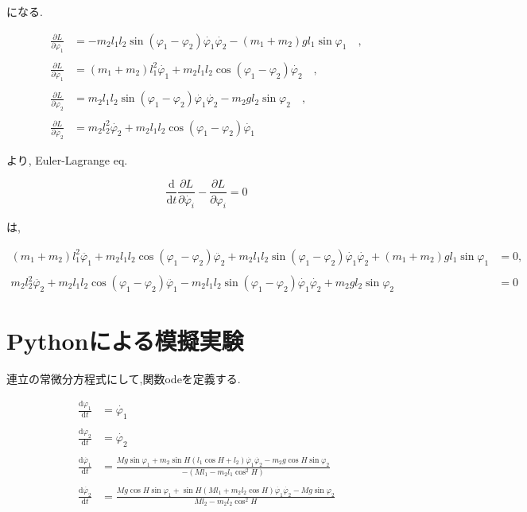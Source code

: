 になる. 

\begin{align*}
\displaystyle\frac{\partial L}{\partial\varphi_1}&=-m_2l_1l_2\sin(\varphi_1-\varphi_2)\dot{\varphi_1}\dot{\varphi_2}-(m_1+m_2)gl_1\sin\varphi_1\quad,\\\\
\displaystyle\frac{\partial L}{\partial\dot{\varphi_1}}&=(m_1+m_2)l_1^2\dot{\varphi_1}+m_2l_1l_2\cos(\varphi_1-\varphi_2)\dot{\varphi_2}\quad,\\\\
\displaystyle\frac{\partial L}{\partial\varphi_2}&=m_2l_1l_2\sin(\varphi_1-\varphi_2)\dot{\varphi_1}\dot{\varphi_2}-m_2gl_2\sin\varphi_2\quad,\\\\
\displaystyle\frac{\partial L}{\partial\dot{\varphi_2}}&=m_2l_2^2\dot{\varphi_2}+m_2l_1l_2\cos(\varphi_1-\varphi_2)\dot{\varphi_1}
\end{align*}

より, Euler-Lagrange eq.

\[
\displaystyle \frac{\mathrm{d}}{\mathrm{d}t}\frac{\partial L}{\partial \dot{\varphi_i}}-\frac{\partial L}{\partial \varphi_i}=0
\]

は,

\begin{align*}
(m_1+m_2)l_1^2\ddot{\varphi_1}+m_2l_1l_2\cos(\varphi_1-\varphi_2)\ddot{\varphi_2}+m_2l_1l_2\sin(\varphi_1-\varphi_2)\dot{\varphi_1}\dot{\varphi_2}+(m_1+m_2)gl_1\sin\varphi_1&=0,\\\\
m_2l_2^2\ddot{\varphi_2}+m_2l_1l_2\cos(\varphi_1-\varphi_2)\ddot{\varphi_1}-m_2l_1l_2\sin(\varphi_1-\varphi_2)\dot{\varphi_1}\dot{\varphi_2}+m_2gl_2\sin\varphi_2&=0
\end{align*}

\section{Pythonによる模擬実験}

連立の常微分方程式にして,関数odeを定義する.

\begin{align*}
\displaystyle\frac{\mathrm{d}\varphi_1}{\mathrm{d}t}&=\dot{\varphi_1}\\\\
\displaystyle\frac{\mathrm{d}\varphi_2}{\mathrm{d}t}&=\dot{\varphi_2}\\\\
\displaystyle\frac{\mathrm{d}\dot{\varphi_1}}{\mathrm{d}t}&=\frac{Mg\sin\varphi_1+m_2\sin H(l_1\cos H+l_2)\dot{\varphi_1}\dot{\varphi_2}-m_2g\cos H\sin\varphi_2}{-\left(Ml_1-m_2l_1\cos^2H\right)}\\\\
\displaystyle\frac{\mathrm{d}\dot{\varphi_2}}{\mathrm{d}t}&=\frac{Mg\cos H\sin\varphi_1+\sin H(Ml_1+m_2l_2\cos H)\dot{\varphi_1}\dot{\varphi_2}-Mg\sin\varphi_2}{Ml_2-m_2l_2\cos^2H}
\end{align*}

